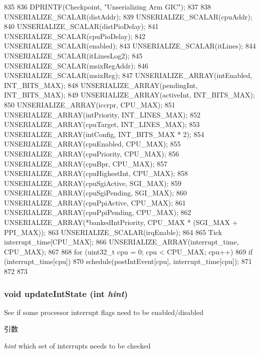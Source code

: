 \begin{DoxyCode}
835 {
836     DPRINTF(Checkpoint, "Unserializing Arm GIC\n");
837 
838     UNSERIALIZE_SCALAR(distAddr);
839     UNSERIALIZE_SCALAR(cpuAddr);
840     UNSERIALIZE_SCALAR(distPioDelay);
841     UNSERIALIZE_SCALAR(cpuPioDelay);
842     UNSERIALIZE_SCALAR(enabled);
843     UNSERIALIZE_SCALAR(itLines);
844     UNSERIALIZE_SCALAR(itLinesLog2);
845     UNSERIALIZE_SCALAR(msixRegAddr);
846     UNSERIALIZE_SCALAR(msixReg);
847     UNSERIALIZE_ARRAY(intEnabled, INT_BITS_MAX);
848     UNSERIALIZE_ARRAY(pendingInt, INT_BITS_MAX);
849     UNSERIALIZE_ARRAY(activeInt, INT_BITS_MAX);
850     UNSERIALIZE_ARRAY(iccrpr, CPU_MAX);
851     UNSERIALIZE_ARRAY(intPriority, INT_LINES_MAX);
852     UNSERIALIZE_ARRAY(cpuTarget, INT_LINES_MAX);
853     UNSERIALIZE_ARRAY(intConfig, INT_BITS_MAX * 2);
854     UNSERIALIZE_ARRAY(cpuEnabled, CPU_MAX);
855     UNSERIALIZE_ARRAY(cpuPriority, CPU_MAX);
856     UNSERIALIZE_ARRAY(cpuBpr, CPU_MAX);
857     UNSERIALIZE_ARRAY(cpuHighestInt, CPU_MAX);
858     UNSERIALIZE_ARRAY(cpuSgiActive, SGI_MAX);
859     UNSERIALIZE_ARRAY(cpuSgiPending, SGI_MAX);
860     UNSERIALIZE_ARRAY(cpuPpiActive, CPU_MAX);
861     UNSERIALIZE_ARRAY(cpuPpiPending, CPU_MAX);
862     UNSERIALIZE_ARRAY(*bankedIntPriority, CPU_MAX * (SGI_MAX + PPI_MAX));
863     UNSERIALIZE_SCALAR(irqEnable);
864 
865     Tick interrupt_time[CPU_MAX];
866     UNSERIALIZE_ARRAY(interrupt_time, CPU_MAX);
867 
868     for (uint32_t cpu = 0; cpu < CPU_MAX; cpu++) {
869         if (interrupt_time[cpu])
870             schedule(postIntEvent[cpu], interrupt_time[cpu]);
871     }
872 
873 }
\end{DoxyCode}
\hypertarget{classPl390_affe49b35938d140039c9e4f8aac94409}{
\subsubsection[{updateIntState}]{\setlength{\rightskip}{0pt plus 5cm}void updateIntState (int {\em hint})}}
\label{classPl390_affe49b35938d140039c9e4f8aac94409}
See if some processor interrupt flags need to be enabled/disabled 
\begin{DoxyParams}{引数}
\item[{\em hint}]which set of interrupts needs to be checked \end{DoxyParams}



